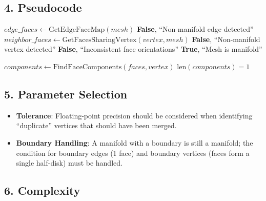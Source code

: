 

\subsection{4. Pseudocode}

\begin{algorithm}
\caption{Is Manifold}
\label{alg:is_manifold}
\begin{algorithmic}[1]
    \State $\mathit{edge\_faces} \gets \text{GetEdgeFaceMap}(mesh)$
            \State \Return \textbf{False}, ``Non-manifold edge detected''
        \EndIf
    \EndFor
        \State $\mathit{neighbor\_faces} \gets \text{GetFacesSharingVertex}(\mathit{vertex}, mesh)$
            \State \Return \textbf{False}, ``Non-manifold vertex detected''
        \EndIf
    \EndFor
        \State \Return \textbf{False}, ``Inconsistent face orientations''
    \EndIf
    \State \Return \textbf{True}, ``Mesh is manifold''
\EndFunction

\Statex

    \State $\mathit{components} \gets \text{FindFaceComponents}(faces, vertex)$
    \State \Return $\text{len}(\mathit{components}) = 1$
\EndFunction
\end{algorithmic}
\end{algorithm}

\subsection{5. Parameter Selection}

\begin{itemize}
    \item \textbf{Tolerance}: Floating-point precision should be considered when identifying ``duplicate'' vertices that should have been merged.
    \item \textbf{Boundary Handling}: A manifold with a boundary is still a manifold; the condition for boundary edges (1 face) and boundary vertices (faces form a single half-disk) must be handled.
\end{itemize}

\subsection{6. Complexity}

